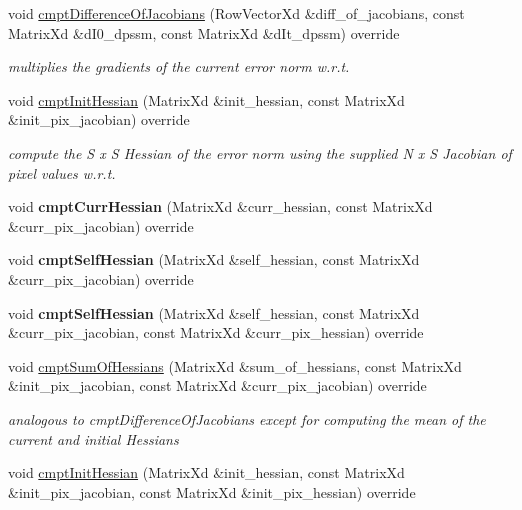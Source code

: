 \begin{DoxyCompactItemize}
\item 
void \hyperlink{classSSDBase_afc46181498ba26b8b164bf8fbc363857}{cmpt\-Difference\-Of\-Jacobians} (Row\-Vector\-Xd \&diff\-\_\-of\-\_\-jacobians, const Matrix\-Xd \&d\-I0\-\_\-dpssm, const Matrix\-Xd \&d\-It\-\_\-dpssm) override
\begin{DoxyCompactList}\small\item\em multiplies the gradients of the current error norm w.\-r.\-t. \end{DoxyCompactList}\item 
void \hyperlink{classSSDBase_a98a8e480e1902cfe1247c28ee40a76be}{cmpt\-Init\-Hessian} (Matrix\-Xd \&init\-\_\-hessian, const Matrix\-Xd \&init\-\_\-pix\-\_\-jacobian) override
\begin{DoxyCompactList}\small\item\em compute the S x S Hessian of the error norm using the supplied N x S Jacobian of pixel values w.\-r.\-t. \end{DoxyCompactList}\item 
\hypertarget{classSSDBase_a521c1d3047b21faf984c18a1b40be5e7}{void {\bfseries cmpt\-Curr\-Hessian} (Matrix\-Xd \&curr\-\_\-hessian, const Matrix\-Xd \&curr\-\_\-pix\-\_\-jacobian) override}\label{classSSDBase_a521c1d3047b21faf984c18a1b40be5e7}

\item 
\hypertarget{classSSDBase_a250618c044a018d79276a22d874b9449}{void {\bfseries cmpt\-Self\-Hessian} (Matrix\-Xd \&self\-\_\-hessian, const Matrix\-Xd \&curr\-\_\-pix\-\_\-jacobian) override}\label{classSSDBase_a250618c044a018d79276a22d874b9449}

\item 
\hypertarget{classSSDBase_a4e76425780845aaf12c2ffd2f78ac6d5}{void {\bfseries cmpt\-Self\-Hessian} (Matrix\-Xd \&self\-\_\-hessian, const Matrix\-Xd \&curr\-\_\-pix\-\_\-jacobian, const Matrix\-Xd \&curr\-\_\-pix\-\_\-hessian) override}\label{classSSDBase_a4e76425780845aaf12c2ffd2f78ac6d5}

\item 
\hypertarget{classSSDBase_a6a2a18740407a22423ed622b86fdde7b}{void \hyperlink{classSSDBase_a6a2a18740407a22423ed622b86fdde7b}{cmpt\-Sum\-Of\-Hessians} (Matrix\-Xd \&sum\-\_\-of\-\_\-hessians, const Matrix\-Xd \&init\-\_\-pix\-\_\-jacobian, const Matrix\-Xd \&curr\-\_\-pix\-\_\-jacobian) override}\label{classSSDBase_a6a2a18740407a22423ed622b86fdde7b}

\begin{DoxyCompactList}\small\item\em analogous to cmpt\-Difference\-Of\-Jacobians except for computing the mean of the current and initial Hessians \end{DoxyCompactList}\item 
\hypertarget{classSSDBase_a9125efd0355b878cd2e8e6e25ab824a4}{void \hyperlink{classSSDBase_a9125efd0355b878cd2e8e6e25ab824a4}{cmpt\-Init\-Hessian} (Matrix\-Xd \&init\-\_\-hessian, const Matrix\-Xd \&init\-\_\-pix\-\_\-jacobian, const Matrix\-Xd \&init\-\_\-pix\-\_\-hessian) override}\label{classSSDBase_a9125efd0355b878cd2e8e6e25ab824a4}


\end{DoxyCompactItemize}
